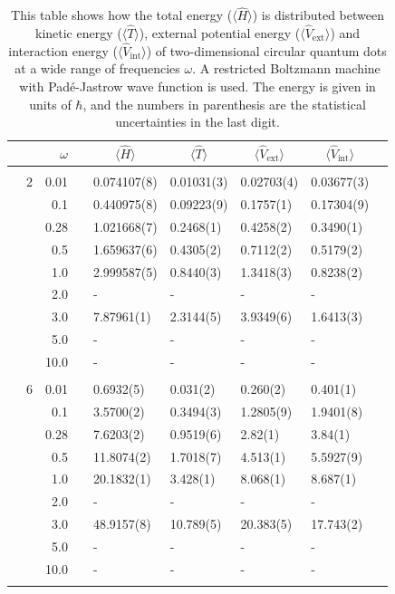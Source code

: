 \begin{table}
	\caption{This table shows how the total energy ($\langle\hat{H}\rangle$) is distributed between kinetic energy ($\langle\hat{T}\rangle$), external potential energy ($\langle\hat{V}_{\text{ext}}\rangle$) and interaction energy ($\langle\hat{V}_{\text{int}}\rangle$) of two-dimensional circular quantum dots at a wide range of frequencies $\omega$. A restricted Boltzmann machine with Padé-Jastrow wave function is used. The energy is given in units of $\hbar$, and the numbers in parenthesis are the statistical uncertainties in the last digit.}
	\label{tab:splitfrequencyQDRBMPJ}
	\begin{tabularx}{\textwidth}{R{1cm}rrcR{2.3cm}R{2.3cm}R{2.3cm}R{2.3cm}R{1cm}} \hline\hline
		&\makecell{\\ \phantom{$N$} \\ \phantom{=}} & $\omega$ &&  &  &  &  & \\ \hline \\
		&2 & 0.01 && 0.074107(8) & 0.01031(3) & 0.02703(4) & 0.03677(3) \\
		&& 0.1 && 0.440975(8) & 0.09223(9) & 0.1757(1) & 0.17304(9) \\
		&& 0.28 && 1.021668(7) & 0.2468(1) & 0.4258(2) & 0.3490(1) \\
		&& 0.5 && 1.659637(6) & 0.4305(2) & 0.7112(2) & 0.5179(2) \\
		&& 1.0 && 2.999587(5) & 0.8440(3) & 1.3418(3) & 0.8238(2) \\
		&& 2.0 && - & - & - & -\\
		&& 3.0 && 7.87961(1) & 2.3144(5) & 3.9349(6) & 1.6413(3) \\
		&& 5.0 && - & - & - & -\\
		&& 10.0 && - & - & - & -\\
		\hdashline \\
		
		&6 & 0.01 && 0.6932(5) & 0.031(2) & 0.260(2) & 0.401(1) \\
		&& 0.1 && 3.5700(2) & 0.3494(3) & 1.2805(9) & 1.9401(8) \\
		&& 0.28 && 7.6203(2) & 0.9519(6) & 2.82(1) & 3.84(1) \\
		&& 0.5 && 11.8074(2) & 1.7018(7) & 4.513(1) & 5.5927(9) \\
		&& 1.0 && 20.1832(1) & 3.428(1) & 8.068(1) & 8.687(1) \\
		&& 2.0 && - & - & - & -\\
		&& 3.0 && 48.9157(8) & 10.789(5) & 20.383(5) & 17.743(2) \\ 
		&& 5.0 && - & - & - & -\\
		&& 10.0 && - & - & - & -\\
		\hdashline \\
		

\end{tabularx}
\end{table}
